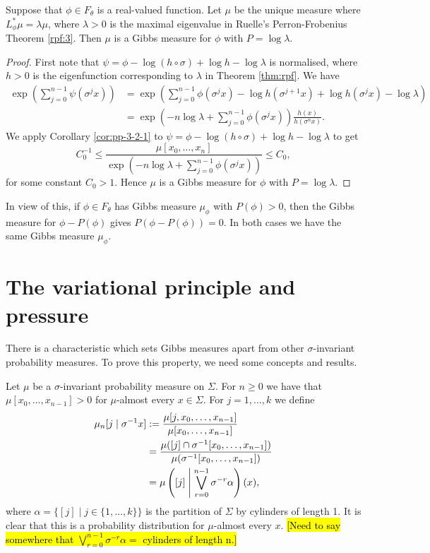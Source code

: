 \begin{corollary}
	Suppose that $\phi \in F_\theta$ is a real-valued function. Let $\mu$ be the unique measure where $L_\phi^*\mu = \lambda\mu$, where $\lambda > 0$ is the maximal eigenvalue in Ruelle's Perron-Frobenius Theorem \ref{rpf:3}. Then $\mu$ is a Gibbs measure for $\phi$ with $P = \log{\lambda}$.
	\begin{proof}
		First note that $\psi = \phi - \log{(h \circ \sigma)} + \log{h} - \log{\lambda}$ is normalised, where $h > 0$ is the eigenfunction corresponding to $\lambda$ in Theorem \ref{thm:rpf}. We have
		\begin{align*}
			\exp\left(\sum_{j = 0}^{n - 1}{\psi(\sigma^j{x})}\right) &= \exp\left(\sum_{j = 0}^{n - 1}{\phi(\sigma^j{x}) - \log{h(\sigma^{j + 1}{x})} + \log{h(\sigma^j{x})} - \log{\lambda}}\right) \\
				&= \exp\left(-n\log{\lambda} + \sum_{j = 0}^{n - 1}{\phi(\sigma^j{x})}\right) \frac{h(x)}{h(\sigma^n{x})}.
		\end{align*}
		We apply Corollary \ref{cor:pp-3-2-1} to $\psi = \phi - \log{(h \circ \sigma)} + \log{h} - \log{\lambda}$ to get
		\[
			C_0^{-1} \leq \frac{\mu[x_0, \dots, x_n]}{\exp\left(-n\log{\lambda} + \sum_{j = 0}^{n - 1}{\phi(\sigma^j{x})}\right)} \leq C_0,
		\]
		for some constant $C_0 > 1$. Hence $\mu$ is a Gibbs measure for $\phi$ with $P = \log{\lambda}$.
	\end{proof}
\end{corollary}

In view of this, if $\phi \in F_\theta$ has Gibbs measure $\mu_\phi$ with $P(\phi) > 0$, then the Gibbs measure for $\phi - P(\phi)$ gives $P(\phi - P(\phi)) = 0$. In both cases we have the same Gibbs measure $\mu_\phi$.

\section{The variational principle and pressure}
There is a characteristic which sets Gibbs measures apart from other $\sigma$-invariant probability measures. To prove this property, we need some concepts and results.

Let $\mu$ be a $\sigma$-invariant probability measure on $\Sigma$. For $n \geq 0$ we have that $\mu[x_0, \dots, x_{n - 1}] > 0$ for $\mu$-almost every $x \in \Sigma$. For $j = 1, \dots, k$ we define
\begin{align*}
	\mu_n[j \mid \sigma^{-1}{x}] &:= \frac{\mu[j, x_0, \dots, x_{n - 1}]}{\mu[x_0, \dots, x_{n - 1}]} \\
		&= \frac{\mu([j] \cap \sigma^{-1}[x_0, \dots, x_{n - 1}])}{\mu(\sigma^{-1}[x_0, \dots, x_{n - 1}])} \\
		&= \mu\left([j] \mathrel{}\middle|\mathrel{} \bigvee_{r = 0}^{n - 1}{\sigma^{-r}{\alpha}}\right)(x),
\end{align*}
where $\alpha = \{[j] \mid j \in \{1, \dots, k\}\}$ is the partition of $\Sigma$ by cylinders of length 1. It is clear that this is a probability distribution for $\mu$-almost every $x$. \hl{[Need to say somewhere that $\bigvee_{r = 0}^{n - 1}{\sigma^{-r}\alpha} =$ cylinders of length n.]}

